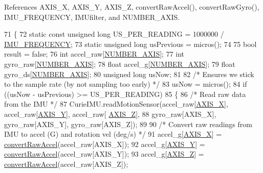 References A\+X\+I\+S\+\_\+X, A\+X\+I\+S\+\_\+Y, A\+X\+I\+S\+\_\+Z, convert\+Raw\+Accel(), convert\+Raw\+Gyro(), I\+M\+U\+\_\+\+F\+R\+E\+Q\+U\+E\+N\+CY, I\+M\+Ufilter, and N\+U\+M\+B\+E\+R\+\_\+\+A\+X\+IS.


\begin{DoxyCode}
71 \{
72   \textcolor{keyword}{static} \textcolor{keyword}{const} \textcolor{keywordtype}{unsigned} \textcolor{keywordtype}{long} US\_PER\_READING = 1000000 / \hyperlink{_orientation_8cpp_aacb21c2e16f8c38c985b8f02787a7baf}{IMU\_FREQUENCY};
73   \textcolor{keyword}{static} \textcolor{keywordtype}{unsigned} \textcolor{keywordtype}{long} usPrevious = micros();
74 
75   \textcolor{keywordtype}{bool} result = \textcolor{keyword}{false};
76   \textcolor{keywordtype}{int} accel\_raw[\hyperlink{_orientation_8cpp_a203c415ee0716aeaf05afca2a736a9dc}{NUMBER\_AXIS}];
77   \textcolor{keywordtype}{int} gyro\_raw[\hyperlink{_orientation_8cpp_a203c415ee0716aeaf05afca2a736a9dc}{NUMBER\_AXIS}];
78   \textcolor{keywordtype}{float} accel\_g[\hyperlink{_orientation_8cpp_a203c415ee0716aeaf05afca2a736a9dc}{NUMBER\_AXIS}];
79   \textcolor{keywordtype}{float} gyro\_ds[\hyperlink{_orientation_8cpp_a203c415ee0716aeaf05afca2a736a9dc}{NUMBER\_AXIS}];
80   \textcolor{keywordtype}{unsigned} \textcolor{keywordtype}{long} usNow;
81 
82   \textcolor{comment}{/* Ensures we stick to the sample rate (by not sampling too early) */}
83   usNow = micros();
84   \textcolor{keywordflow}{if} ((usNow - usPrevious) >= US\_PER\_READING)
85   \{
86     \textcolor{comment}{/* Read raw data from the IMU */}
87     CurieIMU.readMotionSensor(accel\_raw[\hyperlink{_orientation_8cpp_a753faa457a1c2937ea3fdcdb83c3ca5f}{AXIS\_X}], accel\_raw[\hyperlink{_orientation_8cpp_a08f3e26d90cf66bf2840d476e5d4711f}{AXIS\_Y}], accel\_raw[
      \hyperlink{_orientation_8cpp_a220ebc22eb87c8989bfd63ae3cbbe2a8}{AXIS\_Z}],
88                               gyro\_raw[AXIS\_X], gyro\_raw[AXIS\_Y], gyro\_raw[AXIS\_Z]);
89 
90     \textcolor{comment}{/* Convert raw readings from IMU to accel (G) and rotation vel (deg/s) */}
91     accel\_g[\hyperlink{_orientation_8cpp_a753faa457a1c2937ea3fdcdb83c3ca5f}{AXIS\_X}] = \hyperlink{class_logging_device_1_1_orientation_ab8a6f65b7f2b43ec5dd09c47fe93fa0b}{convertRawAccel}(accel\_raw[AXIS\_X]);
92     accel\_g[\hyperlink{_orientation_8cpp_a08f3e26d90cf66bf2840d476e5d4711f}{AXIS\_Y}] = \hyperlink{class_logging_device_1_1_orientation_ab8a6f65b7f2b43ec5dd09c47fe93fa0b}{convertRawAccel}(accel\_raw[AXIS\_Y]);
93     accel\_g[\hyperlink{_orientation_8cpp_a220ebc22eb87c8989bfd63ae3cbbe2a8}{AXIS\_Z}] = \hyperlink{class_logging_device_1_1_orientation_ab8a6f65b7f2b43ec5dd09c47fe93fa0b}{convertRawAccel}(accel\_raw[AXIS\_Z]);

\end{DoxyCode}
